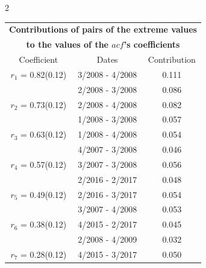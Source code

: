 
\thispagestyle{empty}
\begin{multicols}{2}{ 
\begin{tabular}{ccc}
\multicolumn{3}{c}{\textbf{Contributions of pairs of the extreme values} }  \vspace{-.10in}  \\ 
\multicolumn{3}{c}{ \textbf{to the values of the $acf$'s coefficients}} \\ 
\hline 
\hline                  Coefficient  &  Dates &  Contribution \\ 
\hline 
  $r_{ 1}$ = 0.82(0.12) &       3/2008 -  4/2008 &        0.111   \vspace{-.10in} \\  
&        2/2008 -  3/2008 &        0.086  \vspace{-.02in} \\ \hline 
  $r_{ 2}$ = 0.73(0.12) &       2/2008 -  4/2008 &        0.082   \vspace{-.10in} \\  
&        1/2008 -  3/2008 &        0.057  \vspace{-.02in} \\ \hline 
  $r_{ 3}$ = 0.63(0.12) &       1/2008 -  4/2008 &        0.054   \vspace{-.10in} \\  
&        4/2007 -  3/2008 &        0.046  \vspace{-.02in} \\ \hline 
  $r_{ 4}$ = 0.57(0.12) &       3/2007 -  3/2008 &        0.056   \vspace{-.10in} \\  
&        2/2016 -  2/2017 &        0.048  \vspace{-.02in} \\ \hline 
  $r_{ 5}$ = 0.49(0.12) &       2/2016 -  3/2017 &        0.054   \vspace{-.10in} \\  
&        3/2007 -  4/2008 &        0.053  \vspace{-.02in} \\ \hline 
  $r_{ 6}$ = 0.38(0.12) &       4/2015 -  2/2017 &        0.045   \vspace{-.10in} \\  
&        2/2008 -  4/2009 &        0.032  \vspace{-.02in} \\ \hline 
  $r_{ 7}$ = 0.28(0.12) &       4/2015 -  3/2017 &        0.050   \vspace{-.10in} \\  

\end{tabular}}
\end{multicols}
